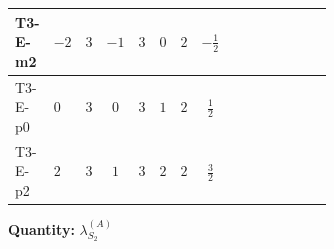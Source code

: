 \documentclass[8pt]{article}
\begin{document}
\begin{landscape}
\begin{longtable}{@{}llcccccc >{\raggedright\arraybackslash}p{0.21\linewidth} >{\raggedright\arraybackslash}p{0.21\linewidth} >{\raggedright\arraybackslash}p{0.21\linewidth}@{}}
\midrule
T3-E-m2 & $-2$ & $3$ & $-1$ & $3$ & $0$ & $2$ & $-\frac{1}{2}$ & \scriptsize\adjustbox{max width=\linewidth}{$\begin{gathered} {\lambda_{S_2}^{(1)}} \left(\frac{1}{2} T_{\nu}^{(2)}+13 {\lambda_{S_2}^{(A)}}\right)\end{gathered}$} & \scriptsize\adjustbox{max width=\linewidth}{$\begin{gathered} +4 {\lambda_{S_2}^{(A)}} T_{\nu}^{(2)}\end{gathered}$} & \scriptsize\adjustbox{max width=\linewidth}{$\begin{gathered} -\operatorname{Tr}\!\left({y_2}\,\left({y_2}\right)^{\dagger}\,{y_2}\,\left({y_2}\right)^{\dagger}\right)\end{gathered}$} \\
\midrule
T3-E-p0 & $0$ & $3$ & $0$ & $3$ & $1$ & $2$ & $\frac{1}{2}$ & \scriptsize\adjustbox{max width=\linewidth}{$\begin{gathered} {\lambda_{S_2}^{(1)}} \left(\frac{1}{2} T_{\nu}^{(2)}+13 {\lambda_{S_2}^{(A)}}\right)\end{gathered}$} & \scriptsize\adjustbox{max width=\linewidth}{$\begin{gathered} +4 {\lambda_{S_2}^{(A)}} T_{\nu}^{(2)}\end{gathered}$} & \scriptsize\adjustbox{max width=\linewidth}{$\begin{gathered} -\operatorname{Tr}\!\left({y_2}\,\left({y_2}\right)^{\dagger}\,{y_2}\,\left({y_2}\right)^{\dagger}\right)\end{gathered}$} \\
\midrule
T3-E-p2 & $2$ & $3$ & $1$ & $3$ & $2$ & $2$ & $\frac{3}{2}$ & \scriptsize\adjustbox{max width=\linewidth}{$\begin{gathered} {\lambda_{S_2}^{(1)}} \left(\frac{1}{2} T_{\nu}^{(2)}+13 {\lambda_{S_2}^{(A)}}\right)\end{gathered}$} & \scriptsize\adjustbox{max width=\linewidth}{$\begin{gathered} +4 {\lambda_{S_2}^{(A)}} T_{\nu}^{(2)}\end{gathered}$} & \scriptsize\adjustbox{max width=\linewidth}{$\begin{gathered} -\operatorname{Tr}\!\left({y_2}\,\left({y_2}\right)^{\dagger}\,{y_2}\,\left({y_2}\right)^{\dagger}\right)\end{gathered}$} \\
\midrule
\bottomrule
\end{longtable}
\clearpage
\noindent\textbf{Quantity: }$\lambda_{S_2}^{(A)}$\par\smallskip

\end{landscape}
\end{document}
